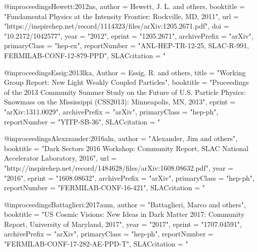 @inproceedings{Hewett:2012ns,
      author         = {Hewett, J. L. and others},
      booktitle      = "{Fundamental Physics at the Intensity Frontier: Rockville, MD, 2011}",
      url            = "https://inspirehep.net/record/1114323/files/arXiv:1205.2671.pdf",
      doi            = "10.2172/1042577",
      year           = "2012",
      eprint         = "1205.2671",
      archivePrefix  = "arXiv",
      primaryClass   = "hep-ex",
      reportNumber   = "ANL-HEP-TR-12-25, SLAC-R-991, FERMILAB-CONF-12-879-PPD",
      SLACcitation   = "%
}

@inproceedings{Essig:2013lka,
	Author = {Essig, R. and others},
      title          = "{Working Group Report: New Light Weakly Coupled
                        Particles}",
      booktitle      = "{Proceedings of the 2013 Community Summer Study on the Future
                        of U.S. Particle Physics: Snowmass on the Mississippi
                        (CSS2013): Minneapolis, MN, 2013}",
      eprint         = "arXiv:1311.0029",
      archivePrefix  = "arXiv",
      primaryClass   = "hep-ph",
      reportNumber   = "YITP-SB-36",
      SLACcitation   = "%
}

@inproceedings{Alexzzander:2016aln,
      author         = "Alexander, Jim and others",
      booktitle      = "{Dark Sectors 2016 Workshop: Community Report, SLAC National Accelerator Laboratory, 2016}",
      url            = "http://inspirehep.net/record/1484628/files/arXiv:1608.08632.pdf",
      year           = "2016",
      eprint         = "1608.08632",
      archivePrefix  = "arXiv",
      primaryClass   = "hep-ph",
      reportNumber   = "FERMILAB-CONF-16-421",
      SLACcitation   = "%
}

@inproceedings{Battaglieri:2017aum,
      author         = "Battaglieri, Marco and others",
      booktitle      = "{US Cosmic Visions: New Ideas in Dark Matter 2017:
                        Community Report, University of Maryland, 2017}",
      year           = "2017",
      eprint         = "1707.04591",
      archivePrefix  = "arXiv",
      primaryClass   = "hep-ph",
      reportNumber   = "FERMILAB-CONF-17-282-AE-PPD-T",
      SLACcitation   = "%
}

